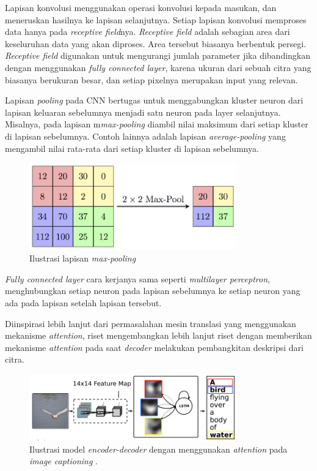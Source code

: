 Lapisan konvolusi menggunakan operasi konvolusi kepada masukan, dan meneruskan hasilnya ke lapisan selanjutnya. Setiap lapisan konvolusi memproses data hanya pada \textit{receptive field}nya. \textit{Receptive field} adalah sebagian area dari keseluruhan data yang akan diproses. Area tersebut biasanya berbentuk persegi. \textit{Receptive field} digunakan untuk mengurangi jumlah parameter jika dibandingkan dengan menggunakan \textit{fully connected layer}, karena ukuran dari sebuah citra yang biasanya berukuran besar, dan setiap pixelnya merupakan input yang relevan.
\bigskip

Lapisan \textit{pooling} pada CNN bertugas untuk menggabungkan kluster neuron dari lapisan keluaran sebelumnya menjadi satu neuron pada layer selanjutnya. Misalnya, pada lapisan m\textit{max-pooling} diambil nilai maksimum dari setiap kluster di lapisan sebelumnya. Contoh lainnya adalah lapisan \textit{average-pooling} yang mengambil nilai rata-rata dari setiap kluster di lapisan sebelumnya.

\begin{figure}[h]
    \centering
    \includegraphics[width=0.8\textwidth]{resources/images/max-pooling.png}
    \caption{Ilustrasi lapisan \textit{max-pooling}}
    \label{fig:max-pooling}
\end{figure}

\textit{Fully connected layer} cara kerjanya sama seperti \textit{multilayer perceptron}, menghubungkan setiap neuron pada lapisan sebelumnya ke setiap neuron yang ada pada lapisan setelah lapisan tersebut.
\bigskip

Diinspirasi lebih lanjut dari permasalahan mesin translasi yang menggunakan mekanisme \textit{attention}, riset \textcite{Xu2015} mengembangkan lebih lanjut riset \textcite{Vinyals2014} dengan memberikan mekanisme \textit{attention} pada saat \textit{decoder} melakukan pembangkitan deskripsi dari citra.

\begin{figure}[h]
    \centering
    \includegraphics[width=0.8\textwidth]{resources/images/image-captioning-encoder-decoder.png}
    \caption{Ilustrasi model \textit{encoder-decoder} dengan menggunakan \textit{attention} pada \textit{image captioning} \parencite{Xu2015}.}
    \label{fig:image-captioning-encoder-decoder}
\end{figure}


